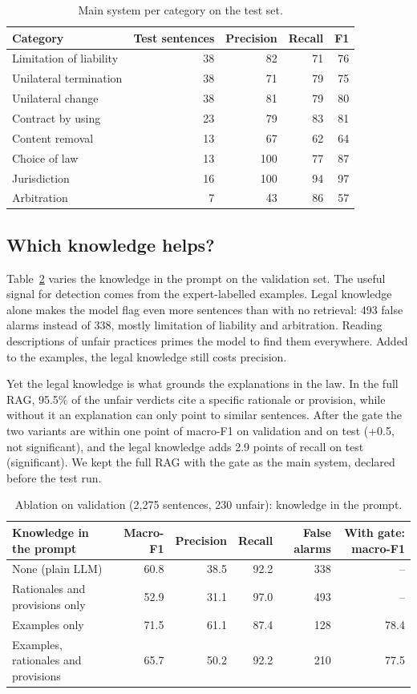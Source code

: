 \begin{table}[ht]
\centering\small
\caption{Main system per category on the test set.}
\label{tab:percategory}
\begin{tabular}{@{}lrrrr@{}}
\toprule
Category & Test sentences & Precision & Recall & F1 \\
\midrule
Limitation of liability & 38 & 82 & 71 & 76 \\
Unilateral termination & 38 & 71 & 79 & 75 \\
Unilateral change & 38 & 81 & 79 & 80 \\
Contract by using & 23 & 79 & 83 & 81 \\
Content removal & 13 & 67 & 62 & 64 \\
Choice of law & 13 & 100 & 77 & 87 \\
Jurisdiction & 16 & 100 & 94 & 97 \\
Arbitration & 7 & 43 & 86 & 57 \\
\bottomrule
\end{tabular}
\end{table}

\subsection{Which knowledge helps?}
\label{sec:ablation}

Table~\ref{tab:ablation} varies the knowledge in the prompt on the validation set. The useful signal for detection comes from the expert-labelled examples. Legal knowledge alone makes the model flag even more sentences than with no retrieval: 493 false alarms instead of 338, mostly limitation of liability and arbitration. Reading descriptions of unfair practices primes the model to find them everywhere. Added to the examples, the legal knowledge still costs precision.

Yet the legal knowledge is what grounds the explanations in the law. In the full RAG, 95.5\% of the unfair verdicts cite a specific rationale or provision, while without it an explanation can only point to similar sentences. After the gate the two variants are within one point of macro-F1 on validation and on test (+0.5, not significant), and the legal knowledge adds 2.9 points of recall on test (significant). We kept the full RAG with the gate as the main system, declared before the test run.

\begin{table}[ht]
\centering\small
\caption{Ablation on validation (2,275 sentences, 230 unfair): knowledge in the prompt.}
\label{tab:ablation}
\begin{tabular}{@{}lrrrrr@{}}
\toprule
Knowledge in the prompt & Macro-F1 & Precision & Recall & False alarms & With gate: macro-F1 \\
\midrule
None (plain LLM) & 60.8 & 38.5 & 92.2 & 338 & -- \\
Rationales and provisions only & 52.9 & 31.1 & 97.0 & 493 & -- \\
Examples only & 71.5 & 61.1 & 87.4 & 128 & 78.4 \\
Examples, rationales and provisions & 65.7 & 50.2 & 92.2 & 210 & 77.5 \\
\bottomrule
\end{tabular}
\end{table}
